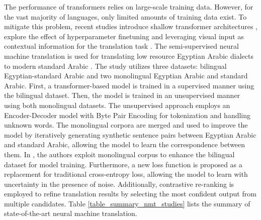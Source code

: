 \documentclass[preprint,12pt]{elsarticle}
\begin{document}
The performance of transformers relies on large-scale training data. However, for the vast majority of languages, only limited amounts of training data exist. To mitigate this problem, recent studies introduce shallow transformer architectures \citep{gezmu_transformers_2022}, explore the effect of hyperparameter finetuning \citep{araabi_optimizing_2020} and leveraging visual input as contextual information for the translation task \citep{meetei_cues_2023}. The semi-supervised neural machine translation is used for translating low resource Egyptian Arabic dialects to modern standard Arabic \citep{faheem_improving_2024}. The study utilizes three datasets: bilingual Egyptian-standard Arabic and two monolingual Egyptian Arabic and standard Arabic. First, a transformer-based model is trained in a supervised manner using the bilingual dataset. Then, the model is trained in an unsupervised manner using both monolingual datasets. The unsupervised approach employs an Encoder-Decoder model with Byte Pair Encoding for tokenization and handling unknown words. The monolingual corpora are merged and used to improve the model by iteratively generating synthetic sentence pairs between Egyptian Arabic and standard Arabic, allowing the model to learn the correspondence between them. In \citep{li_towards_2024}, the authors exploit monolingual corpus to enhance the bilingual dataset for model training. Furthermore, a new loss function is proposed as a replacement for traditional cross-entropy loss, allowing the model to learn with uncertainty in the presence of noise. Additionally, contrastive re-ranking is employed to refine translation results by selecting the most confident output from multiple candidates. Table \ref{table_summary_nmt_studies} lists the summary of state-of-the-art neural machine translation.
\end{document}
